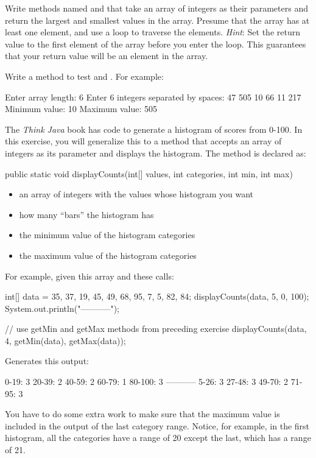 \begin{exercise}
Write methods named  and  that take an array of integers as their parameters and return the largest and smallest values in the array. Presume that the array has at least one element, and use a loop to traverse the elements.  {\em Hint}: Set the return value to the first element of the array before you enter the loop. This guarantees that your return value will be an element in the array.

Write a  method to test  and . For example:

\begin{stdout}
Enter array length: 6
Enter 6 integers separated by spaces: 47 505 10 66 11 217
Minimum value: 10
Maximum value: 505
\end{stdout}

\end{exercise}

\begin{exercise}
The {\em Think Java} book has code to generate a histogram of scores from 0-100. In this exercise, you will generalize this to a method that accepts an array of integers as its parameter and displays the histogram.  The method is declared as:

\begin{code}
public static void displayCounts(int[] values,
     int categories, int min, int max)
\end{code}

\begin{itemize}
\item {} an array of integers with the values whose histogram you want
\item {} how many ``bars'' the histogram has
\item {} the minimum value of the histogram categories
\item {} the maximum value of the histogram categories
\end{itemize}

For example, given this array and these calls:

\begin{code}
int[] data =  {35, 37, 19, 45, 49, 68, 95, 7, 5, 82, 84};
displayCounts(data, 5, 0, 100);
System.out.println("-----------");

// use getMin and getMax methods from preceding exercise
displayCounts(data, 4, getMin(data), getMax(data));
\end{code}

Generates this output:

\begin{stdout}
0-19: 3
20-39: 2
40-59: 2
60-79: 1
80-100: 3
-----------
5-26: 3
27-48: 3
49-70: 2
71-95: 3
\end{stdout}

You have to do some extra work to make sure that the maximum value is included in the output of the last category range. Notice, for example, in the first histogram, all the categories have a range of 20 except the last, which has a range of 21.
\end{exercise}

